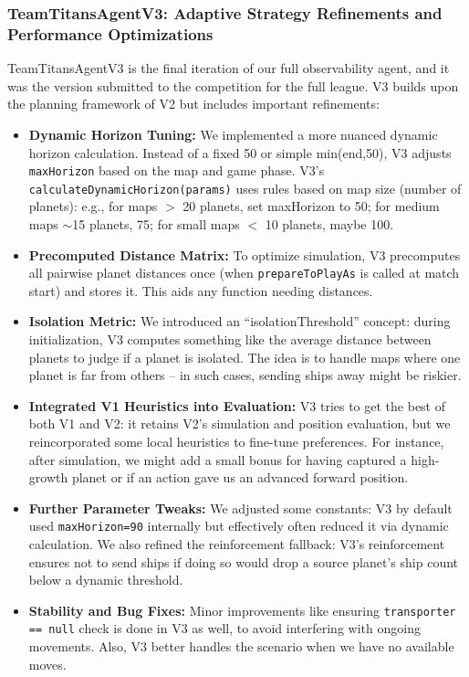 \documentclass[conference]{IEEEtran}
\begin{document}
\subsubsection{TeamTitansAgentV3: Adaptive Strategy Refinements and Performance Optimizations}

TeamTitansAgentV3 is the final iteration of our full observability agent, and it was the version submitted to the competition for the full league. V3 builds upon the planning framework of V2 but includes important refinements:

\begin{itemize}
\item \textbf{Dynamic Horizon Tuning:} We implemented a more nuanced dynamic horizon calculation. Instead of a fixed 50 or simple min(end,50), V3 adjusts \texttt{maxHorizon} based on the map and game phase. V3's \texttt{calculateDynamicHorizon(params)} uses rules based on map size (number of planets): e.g., for maps $>$ 20 planets, set maxHorizon to 50; for medium maps $\sim$15 planets, 75; for small maps $<$ 10 planets, maybe 100.

\item \textbf{Precomputed Distance Matrix:} To optimize simulation, V3 precomputes all pairwise planet distances once (when \texttt{prepareToPlayAs} is called at match start) and stores it. This aids any function needing distances.

\item \textbf{Isolation Metric:} We introduced an ``isolationThreshold'' concept: during initialization, V3 computes something like the average distance between planets to judge if a planet is isolated. The idea is to handle maps where one planet is far from others -- in such cases, sending ships away might be riskier.

\item \textbf{Integrated V1 Heuristics into Evaluation:} V3 tries to get the best of both V1 and V2: it retains V2's simulation and position evaluation, but we reincorporated some local heuristics to fine-tune preferences. For instance, after simulation, we might add a small bonus for having captured a high-growth planet or if an action gave us an advanced forward position.

\item \textbf{Further Parameter Tweaks:} We adjusted some constants: V3 by default used \texttt{maxHorizon=90} internally but effectively often reduced it via dynamic calculation. We also refined the reinforcement fallback: V3's reinforcement ensures not to send ships if doing so would drop a source planet's ship count below a dynamic threshold.

\item \textbf{Stability and Bug Fixes:} Minor improvements like ensuring \texttt{transporter == null} check is done in V3 as well, to avoid interfering with ongoing movements. Also, V3 better handles the scenario when we have no available moves.
\end{itemize}
\end{document}
